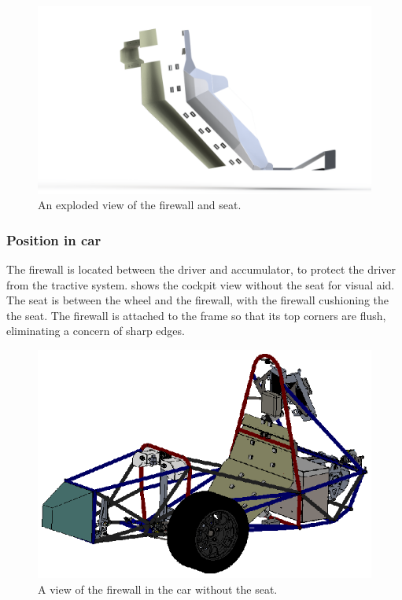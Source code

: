 \documentclass{article}
\begin{document}
\begin{figure}[H]
    \centering
    \includegraphics[width = 1 \textwidth]{firewall_exploded.png}
    \caption{An exploded view of the firewall and seat. }
    \label{fig:firewall_exploded}
\end{figure}

\subsubsection{Position in car}
The firewall is located between the driver and accumulator, to protect the driver from the tractive system.  shows the cockpit view without the seat for visual aid. The seat is between the wheel and the firewall, with the firewall cushioning the the seat.  The firewall is attached to the frame so that its top corners are flush, eliminating a concern of sharp edges.

\begin{figure}[H]
    \centering
    \includegraphics[width = 1 \textwidth]{firewall_in_car.png}
    \caption{A view of the firewall in the car without the seat. }
    \label{fig:firewall_in_car}
\end{figure}
\end{document}
